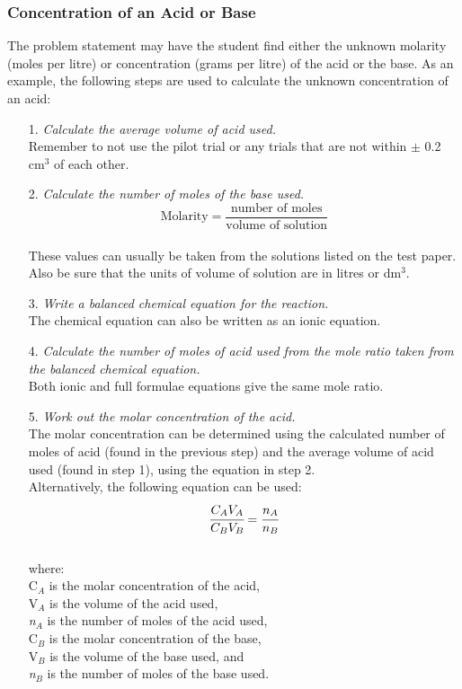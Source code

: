 \subsubsection{Concentration of an Acid or Base}

The problem statement may have the student find either the unknown molarity (moles per litre) or concentration (grams per litre) of the acid or the base. As an example, the following steps are used to calculate the unknown concentration of an acid:

\begin{enumerate}
\item[1.] \textit{Calculate the average volume of acid used.}\\
Remember to not use the pilot trial or any trials that are not within $\pm$ 0.2 cm$^3$ of each other.
\item[2.] \textit{Calculate the number of moles of the base used.}\\
$$\text{Molarity} = \frac{\text{number of moles}}{\text{volume of solution}}$$\\
These values can usually be taken from the solutions listed on the test paper. Also be sure that the units of volume of solution are in litres or dm$^3$.
\item[3.] \textit{Write a balanced chemical equation for the reaction.}\\
The chemical equation can also be written as an ionic equation.
\item[4.] \textit{Calculate the number of moles of acid used from the mole ratio taken from the balanced chemical equation.}\\
Both ionic and full formulae equations give the same mole ratio.
\item[5.] \textit{Work out the molar concentration of the acid.}\\
The molar concentration can be determined using the calculated number of moles of acid (found in the previous step) and the average volume of acid used (found in step 1), using the equation in step 2.\\
Alternatively, the following equation can be used:\\
$$\cfrac{C_AV_A}{C_BV_B} = \cfrac{n_A}{n_B}$$\\
where:\\
C$_A$ is the molar concentration of the acid,\\
V$_A$ is the volume of the acid used,\\
\textit{n}$_A$ is the number of moles of the acid used,\\
C$_B$ is the molar concentration of the base,\\
V$_B$ is the volume of the base used, and\\
\textit{n}$_B$ is the number of moles of the base used.\\
\end{enumerate}
